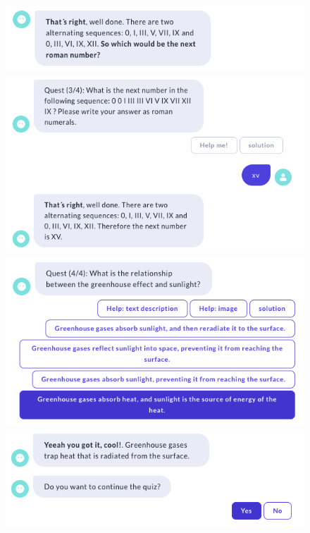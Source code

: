 \begin{figure}[H]
  \centering
  \includegraphics[width=0.7\linewidth]{images/Game/Q3.3.png}
  \includegraphics[width=0.7\linewidth]{images/VickyQuiz/Q4.png}
  \includegraphics[width=0.7\linewidth]{images/VickyQuiz/Q5.png}
  \includegraphics[width=0.7\linewidth]{images/VickyQuiz/Q6.png}
  \end{figure} 

